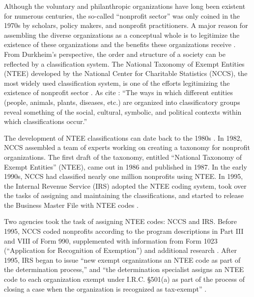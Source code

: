 \documentclass[12pt]{article}
\begin{document}
Although the voluntary and philanthropic organizations have long been existent for numerous centuries, the so-called ``nonprofit sector'' was only coined in the 1970s by scholars, policy makers, and nonprofit practitioners. A major reason for assembling the diverse organizations as a conceptual whole is to legitimize the existence of these organizations and the benefits these organizations receive \parencites[54-55]{HallHistoricalOverviewPhilanthropy2006}{BarmanClassificatoryStrugglesNonprofit2013}. From Durkheim's \citeyear{DurkheimElementaryFormsReligious2012} perspective, the order and structure of a society can be reflected by a classification system. The National Taxonomy of Exempt Entities (NTEE) developed by the National Center for Charitable Statistics (NCCS), the most widely used classification system, is one of the efforts legitimizing the existence of nonprofit sector \parencite{Hodgkinsonnewresearchplanning1991,HodgkinsonMappingnonprofitsector1990}. As \textcite[105]{BarmanClassificatoryStrugglesNonprofit2013} cite \textcite[601]{ClarkeSimpleTechnologyComplex1996}: ``The ways in which different entities (people, animals, plants, diseases, etc.) are organized into classificatory groups reveal something of the social, cultural, symbolic, and political contexts within which classifications occur.''

The development of NTEE classifications can date back to the 1980s \parencite[8-9, 11]{HodgkinsonMappingnonprofitsector1990}. In 1982, NCCS assembled a team of experts working on creating a taxonomy for nonprofit organizations. The first draft of the taxonomy, entitled ``National Taxonomy of Exempt Entities'' (NTEE), came out in 1986 and published in 1987. In the early 1990s, NCCS had classified nearly one million nonprofits using NTEE. In 1995, the Internal Revenue Service (IRS) adopted the NTEE coding system, took over the tasks of assigning and maintaining the classifications, and started to release the Business Master File with NTEE codes \parencite{USInternalRevenueServiceExemptOrganizationsBusiness2014,USInternalRevenueServiceIRSStaticFiles2013}.

Two agencies took the task of assigning NTEE codes: NCCS and IRS. Before 1995, NCCS coded nonprofits according to the program descriptions in Part III and VIII of Form 990, supplemented with information from Form 1023 (``Application for Recognition of Exemption'') and additional research \parencite[16]{NationalCenterforCharitableStatisticsGuideUsingNCCS2006}. After 1995, IRS began to issue ``new exempt organizations an NTEE code as part of the determination process,'' and ``the determination specialist assigns an NTEE code to each organization exempt under I.R.C. \S 501(a) as part of the process of closing a case when the organization is recognized as tax-exempt'' \parencite[1]{USInternalRevenueServiceIRSStaticFiles2013}.
\end{document}
